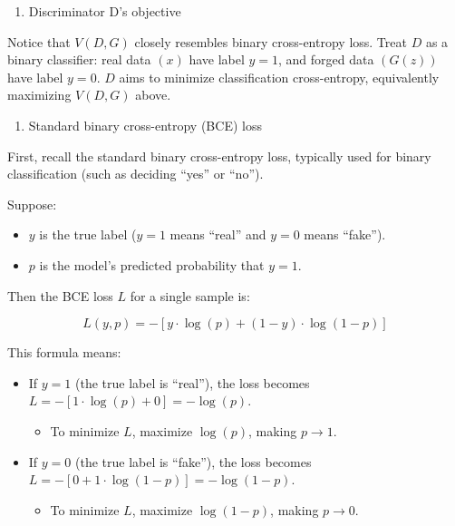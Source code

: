 \begin{enumerate}
\def\labelenumi{(\arabic{enumi})}
\tightlist
\item
  Discriminator D's objective
\end{enumerate}

Notice that \(V(D, G)\) closely resembles binary cross-entropy loss. Treat \(D\) as a binary classifier: real data \((x)\) have label \(y=1\), and forged data \((G(z))\) have label \(y=0\). \(D\) aims to minimize classification cross-entropy, equivalently maximizing \(V(D, G)\) above.

\begin{enumerate}
\def\labelenumi{\arabic{enumi}.}
\tightlist
\item
  Standard binary cross-entropy (BCE) loss
\end{enumerate}

First, recall the standard binary cross-entropy loss, typically used for binary classification (such as deciding ``yes'' or ``no'').

Suppose:

\begin{itemize}
\tightlist
\item
  \(y\) is the true label (\(y=1\) means ``real'' and \(y=0\) means ``fake'').
\item
  \(p\) is the model's predicted probability that \(y=1\).
\end{itemize}

Then the BCE loss \(L\) for a single sample is:

\[
L(y,p) = -[y\cdot\log(p) + (1-y)\cdot\log(1-p)]
\]

This formula means:

\begin{itemize}
\tightlist
\item
  If \(y=1\) (the true label is ``real''), the loss becomes \(L=-[1\cdot\log(p)+0]=-\log(p)\).

  \begin{itemize}
  \tightlist
  \item
    To minimize \(L\), maximize \(\log(p)\), making \(p\to 1\).
  \end{itemize}
\item
  If \(y=0\) (the true label is ``fake''), the loss becomes \(L=-[0+1\cdot\log(1-p)]=-\log(1-p)\).

  \begin{itemize}
  \tightlist
  \item
    To minimize \(L\), maximize \(\log(1-p)\), making \(p\to 0\).
  \end{itemize}
\end{itemize}


